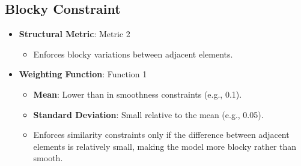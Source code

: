 \documentclass[a4paper,12pt]{article}
\begin{document}
\subsection{Blocky Constraint}
\begin{itemize}
    \item \textbf{Structural Metric}: Metric 2
          \begin{itemize}
              \item Enforces blocky variations between adjacent elements.
          \end{itemize}
    \item \textbf{Weighting Function}: Function 1
          \begin{itemize}
              \item \textbf{Mean}: Lower than in smoothness constraints (e.g., 0.1).
              \item \textbf{Standard Deviation}: Small relative to the mean (e.g., 0.05).
              \item Enforces similarity constraints only if the difference between adjacent
                    elements is relatively small, making the model more blocky rather than smooth.
          \end{itemize}
\end{itemize}
\end{document}

